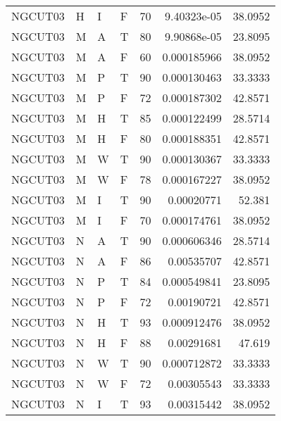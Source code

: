 \begin{longtable}{llllrrr}
    NGCUT03  & H         & I         & F          & 70         & 9.40323e-05 & 38.0952  \\
    NGCUT03  & M         & A         & T          & 80         & 9.90868e-05 & 23.8095  \\
    NGCUT03  & M         & A         & F          & 60         & 0.000185966 & 38.0952  \\
    NGCUT03  & M         & P         & T          & 90         & 0.000130463 & 33.3333  \\
    NGCUT03  & M         & P         & F          & 72         & 0.000187302 & 42.8571  \\
    NGCUT03  & M         & H         & T          & 85         & 0.000122499 & 28.5714  \\
    NGCUT03  & M         & H         & F          & 80         & 0.000188351 & 42.8571  \\
    NGCUT03  & M         & W         & T          & 90         & 0.000130367 & 33.3333  \\
    NGCUT03  & M         & W         & F          & 78         & 0.000167227 & 38.0952  \\
    NGCUT03  & M         & I         & T          & 90         & 0.00020771  & 52.381   \\
    NGCUT03  & M         & I         & F          & 70         & 0.000174761 & 38.0952  \\
    NGCUT03  & N         & A         & T          & 90         & 0.000606346 & 28.5714  \\
    NGCUT03  & N         & A         & F          & 86         & 0.00535707  & 42.8571  \\
    NGCUT03  & N         & P         & T          & 84         & 0.000549841 & 23.8095  \\
    NGCUT03  & N         & P         & F          & 72         & 0.00190721  & 42.8571  \\
    NGCUT03  & N         & H         & T          & 93         & 0.000912476 & 38.0952  \\
    NGCUT03  & N         & H         & F          & 88         & 0.00291681  & 47.619   \\
    NGCUT03  & N         & W         & T          & 90         & 0.000712872 & 33.3333  \\
    NGCUT03  & N         & W         & F          & 72         & 0.00305543  & 33.3333  \\
    NGCUT03  & N         & I         & T          & 93         & 0.00315442  & 38.0952  \\

\end{longtable}
